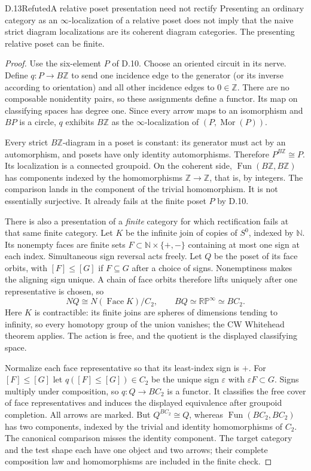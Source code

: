 \begin{result}{D.13}{Refuted}{A relative poset presentation need not rectify}
Presenting an ordinary category as an $\infty$-localization of a
relative poset does not imply that the naive strict diagram
localizations are its coherent diagram categories. The presenting
relative poset can be finite.
\end{result}
\begin{proof}
Use the six-element $P$ of D.10. Choose an oriented circuit in its
nerve. Define $q:P\to B\mathbb Z$ to send one incidence edge to
the generator (or its inverse according to orientation) and all
other incidence edges to $0\in\mathbb Z$. There are no composable
nonidentity pairs, so these assignments define a functor. Its map
on classifying spaces has degree one. Since every arrow maps to an
isomorphism and $BP$ is a circle, $q$ exhibits $B\mathbb Z$ as the
$\infty$-localization of $(P,\operatorname{Mor}(P))$.

Every strict $B\mathbb Z$-diagram in a poset is constant: its
generator must act by an automorphism, and posets have only identity
automorphisms. Therefore $P^{B\mathbb Z}\cong P$. Its localization
is a connected groupoid. On the coherent side,
$\operatorname{Fun}(B\mathbb Z,B\mathbb Z)$ has components indexed
by the homomorphisms $\mathbb Z\to\mathbb Z$, that is, by integers.
The comparison lands in the component of the trivial homomorphism.
It is not essentially surjective. It already fails at the finite
poset $P$ by D.10.

There is also a presentation of a \emph{finite} category for which
rectification fails at that same finite category. Let $K$ be the
infinite join of copies of $S^0$, indexed by $\mathbb N$. Its
nonempty faces are finite sets $F\subset\mathbb N\times\{+,-\}$
containing at most one sign at each index. Simultaneous sign reversal
acts freely. Let $Q$ be the poset of its face orbits, with
$[F]\leq[G]$ if $F\subseteq G$ after a choice of signs. Nonemptiness
makes the aligning sign unique. A chain of face orbits therefore
lifts uniquely after one representative is chosen, so
\[
 NQ\cong N(\operatorname{Face}K)/C_2,
 \qquad BQ\simeq\mathbb{RP}^{\infty}\simeq BC_2.
\]
Here $K$ is contractible: its finite joins are spheres of dimensions
tending to infinity, so every homotopy group of the union vanishes;
the CW Whitehead theorem applies. The action is free, and the
quotient is the displayed classifying space.

Normalize each face representative so that its least-index sign is
$+$. For $[F]\leq[G]$ let $q([F]\leq[G])\in C_2$ be the unique
sign $\varepsilon$ with $\varepsilon F\subset G$. Signs multiply
under composition, so $q:Q\to BC_2$ is a functor. It classifies
the free cover of face representatives and induces the displayed
equivalence after groupoid completion. All arrows are marked.
But $Q^{BC_2}\cong Q$, whereas
$\operatorname{Fun}(BC_2,BC_2)$ has two components, indexed by
the trivial and identity homomorphisms of $C_2$. The canonical
comparison misses the identity component. The target category and
the test shape each have one object and two arrows; their complete
composition law and homomorphisms are included in the finite check.


\end{proof}
